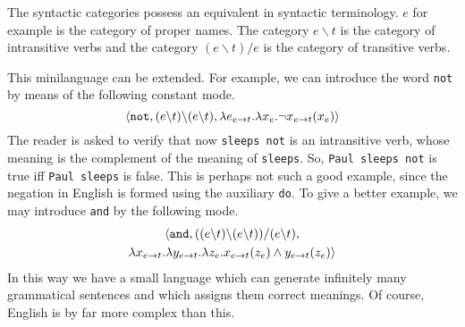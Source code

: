The syntactic categories possess an equivalent in syntactic
terminology. $e$ for example is the category of proper
names. The category $e \backslash t$ is the category of
intransitive verbs and the category $(e \backslash t)/e$ is
the category of transitive verbs.

This minilanguage can be extended.  For example, we can introduce 
the word {\tt not} by means of the following constant mode.
\begin{equation}
\langle \mbox{\tt not}, (e\backslash t)\backslash (e \backslash t),
    \lambda e_{e \rightarrow t}. \lambda x_e. \neg
    x_{e \rightarrow t}(x_e)\rangle
\end{equation}
The reader is asked to verify that now {\tt sleeps not} is
an intransitive verb, whose meaning is the complement of the
meaning  of {\tt sleeps}. So, {\tt Paul sleeps not}
is true iff {\tt Paul sleeps} is false.
This is perhaps not such a good example, since the negation
in English is formed using the auxiliary {\tt do}.  To give 
a better example, we may introduce {\tt and} by the following mode.
\begin{multline}
\langle \mbox{\tt and},
    ((e \backslash t)\backslash (e \backslash t))/(e \backslash t),
\\
    \lambda x_{e \rightarrow t}.\lambda y_{e \rightarrow t}.\lambda z_{e}.
    x_{e \rightarrow t}(z_e) \wedge y_{e \rightarrow t}(z_e)\rangle
\end{multline}
In this way we have a small language which can generate infinitely
many grammatical sentences and which assigns them correct meanings.
Of course, English is by far more complex than this.

